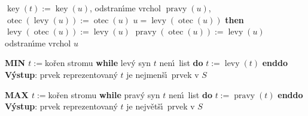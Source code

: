 \documentclass[a4paper,12pt]{article}
\DeclareMathOperator*{\otec}{otec}
\DeclareMathOperator*{\levy}{levy}
\DeclareMathOperator*{\pravy}{pravy}
\DeclareMathOperator*{\key}{key}
\begin{document}
\phantom{------}$\key(t):=\key(u)$, odstran\'\i me vrchol $\pravy(u)$,\newline 
\phantom{------}$\otec(\levy(u)):=\otec(u)$\newline 
\phantom{------}{\bf if} $u=\levy(\otec(u))$ {\bf then}\newline 
\phantom{---------}$\levy(\otec(u)):=\levy(u)$\newline 
\phantom{------}{\bf else}\newline 
\phantom{---------}$\pravy(\otec(u)):=\levy(u)$\newline 
\phantom{------}{\bf endif\newline}
\phantom{------}odstran\'\i me vrchol $u$\newline 
\phantom{---}{\bf endif\newline 
endif}
\medskip

{\bf MIN\newline 
$t:=$}ko\v ren stromu\newline 
{\bf while} lev\'y syn $t$ nen\'\i\ list {\bf do} $t:=\levy(t)$ {\bf enddo\newline 
V\'ystup}: prvek reprezentovan\'y $t$ je nejmen\v s\'\i\ prvek v $
S$
\medskip

{\bf MAX\newline 
$t:=$}ko\v ren stromu\newline 
{\bf while} prav\'y syn $t$ nen\'\i\ list {\bf do} $t:=\pravy(t)$ {\bf enddo\newline 
V\'ystup}: prvek reprezentovan\'y $t$ je nejv\v et\v s\'\i\ prvek v $
S$
\medskip
\end{document}
